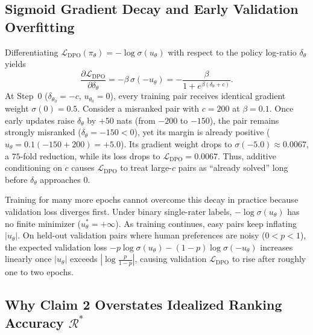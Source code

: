 \documentclass[11pt]{article}
\theoremstyle{plain}
\theoremstyle{definition}
\newcommand{\pitheta}{\pi_{\theta}}
\newcommand{\LDPO}{\mathcal{L}_{\mathrm{DPO}}}
\newcommand{\Racc}{\mathcal{R}}
\begin{document}
\subsection{Sigmoid Gradient Decay and Early Validation Overfitting}

Differentiating $\LDPO(\pitheta) = -\log \sigma(u_\theta)$ with respect to the policy log-ratio $\delta_\theta$ yields
\begin{equation}
  \frac{\partial \LDPO}{\partial \delta_\theta}
  = -\beta\,\sigma(-u_\theta)
  = -\frac{\beta}{1 + e^{\beta(\delta_\theta + c)}}.
  \label{eq:grad_starvation}
\end{equation}
At Step~$0$ ($\delta_{\theta_0} = -c$, $u_{\theta_0} = 0$), every training pair receives identical gradient weight $\sigma(0) = 0.5$. Consider a misranked pair with $c = 200$ at $\beta = 0.1$. Once early updates raise $\delta_\theta$ by $+50$ nats (from $-200$ to $-150$), the pair remains strongly misranked ($\delta_\theta = -150 < 0$), yet its margin is already positive ($u_\theta = 0.1(-150 + 200) = +5.0$). Its gradient weight drops to $\sigma(-5.0) \approx 0.0067$, a $75$-fold reduction, while its loss drops to $\LDPO = 0.0067$. Thus, additive conditioning on $c$ causes $\LDPO$ to treat large-$c$ pairs as ``already solved'' long before $\delta_\theta$ approaches $0$.

Training for many more epochs cannot overcome this decay in practice because validation loss diverges first. Under binary single-rater labels, $-\log \sigma(u_\theta)$ has no finite minimizer ($u_\theta^* = +\infty$). As training continues, easy pairs keep inflating $|u_\theta|$. On held-out validation pairs where human preferences are noisy ($0 < p < 1$), the expected validation loss $-p \log \sigma(u_\theta) - (1 - p)\log \sigma(-u_\theta)$ increases linearly once $|u_\theta|$ exceeds $|\log \frac{p}{1-p}|$, causing validation $\LDPO$ to rise after roughly one to two epochs.

\subsection{Why Claim 2 Overstates Idealized Ranking Accuracy \texorpdfstring{$\Racc^*$}{R*}}
\end{document}
